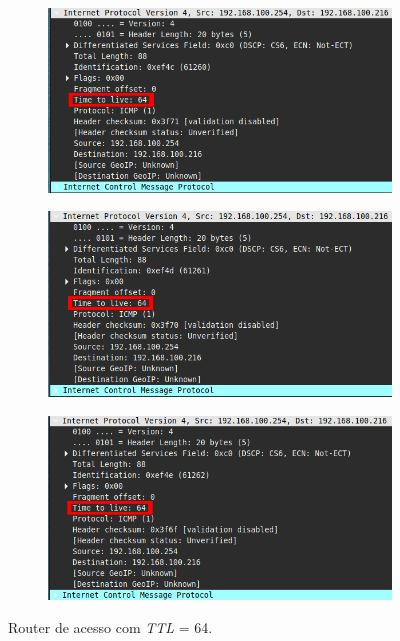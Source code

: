 \documentclass{llncs}
\begin{document}
\begin{figure}[h]
	\centering
	\begin{subfigure}{.4\textwidth}
		\centering
		\includegraphics[width=0.98\linewidth]{./imagens/icmp_1_TTL64_router.png}
	\end{subfigure}%
	\begin{subfigure}{.4\textwidth}
		\centering
		\includegraphics[width=0.98\linewidth]{./imagens/icmp_2_TTL64_router.png}
	\end{subfigure}%
	\begin{subfigure}{.4\textwidth}
		\centering
		\includegraphics[width=0.98\linewidth]{./imagens/icmp_3_TTL64_router.png}
	\end{subfigure}
	\caption{Router de acesso com \textit{TTL} = 64.}
	\label{fig:field_change}
\end{figure}
\end{document}
